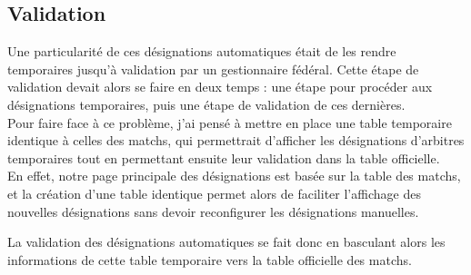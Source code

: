 \subsection{Validation}
\vspace{1cm}

Une particularité de ces désignations automatiques était de les rendre temporaires jusqu’à validation par un gestionnaire fédéral. Cette étape de validation devait alors se faire en deux temps : une étape pour procéder aux désignations temporaires, puis une étape de validation de ces dernières.\\

Pour faire face à ce problème, j’ai pensé à mettre en place une table temporaire identique à celles des matchs, qui permettrait d’afficher les désignations d’arbitres temporaires tout en permettant ensuite leur validation dans la table officielle.\\

En effet, notre page principale des désignations est basée sur la table des matchs, et la création d’une table identique permet alors de faciliter l’affichage des nouvelles désignations sans devoir reconfigurer les désignations manuelles.

La validation des désignations automatiques se fait donc en basculant alors les informations de cette table temporaire vers la table officielle des matchs.